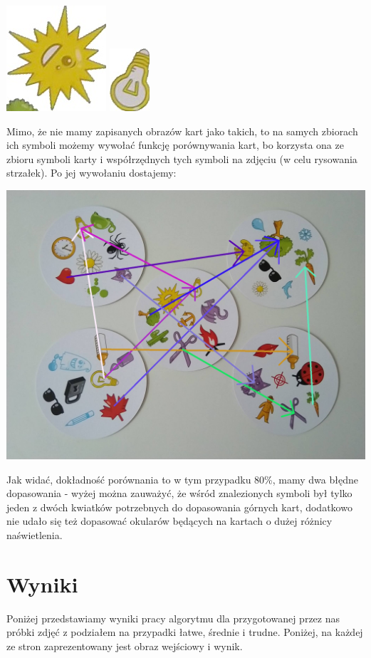 \documentclass[10pt,a4paper]{article}
\begin{document}
\begin{center}
\includegraphics[scale=0.5]{2.3/card1sign6.jpg}
\includegraphics[scale=0.5]{2.3/card1sign7.jpg}
\end{center}
\newpage
Mimo, że nie mamy zapisanych obrazów kart jako takich, to na samych zbiorach ich symboli możemy wywołać funkcję porównywania kart, bo korzysta ona ze zbioru symboli karty i współrzędnych tych symboli na zdjęciu (w celu rysowania strzałek). Po jej wywołaniu dostajemy:
\begin{center}
\includegraphics[scale=0.25]{2.3/img_arrows0.jpg}
\end{center}
Jak widać, dokładność porównania to w tym przypadku 80\%, mamy dwa błędne dopasowania - wyżej można zauważyć, że wśród znalezionych symboli był tylko jeden z dwóch kwiatków potrzebnych do dopasowania górnych kart, dodatkowo nie udało się też dopasować okularów będących na kartach o dużej różnicy naświetlenia.
\newpage
\section{Wyniki}
Poniżej przedstawiamy wyniki pracy algorytmu dla przygotowanej przez nas próbki zdjęć z podziałem na przypadki łatwe, średnie i trudne. Poniżej, na każdej ze stron zaprezentowany jest obraz wejściowy i wynik.
\end{document}
